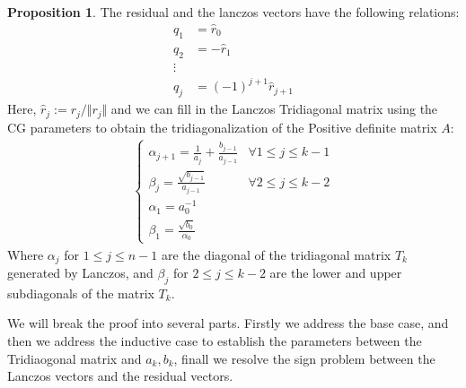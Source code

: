 \documentclass[]{article}
\theoremstyle{definition}
\newtheorem{prop}{Proposition}[section]  %
\begin{document}
        \begin{prop}
            The residual and the lanczos vectors have the following relations: 
            \begin{align}
                q_1 &= \hat r_0\\
                q_2 &= -\hat r_1
                \\
                \vdots
                \\
                q_j &= (-1)^{j + 1}\hat r_{j + 1}
            \end{align}
            Here, $\hat{r}_j:= r_j/\Vert r_j\Vert$ and we can fill in the Lanczos Tridiagonal matrix using the CG parameters to obtain the tridiagonalization of the Positive definite matrix $A$: 
            \begin{align}
                \begin{cases}
                    \alpha_{j + 1} = \frac{1}{a_j} + \frac{b_{j - 1}}{a_{j - 1}}
                    & \forall 1 \le j \le k - 1
                    \\
                    \beta_{j} = \frac{\sqrt{b_{j - 1}}}{a_{j - 1}}
                    & \forall 2 \le j \le k - 2 
                    \\
                    \alpha_1 = a_0^{-1} & 
                    \\
                    \beta_1 = \frac{\sqrt{b_0}}{\alpha_0}
                \end{cases}
            \end{align}
            Where $\alpha_j$ for $1\le j \le n - 1$ are the diagonal of the tridiagonal matrix $T_k$ generated by Lanczos, and $\beta_j$ for $2\le j \le k - 2$ are the lower and upper subdiagonals of the matrix $T_k$. 
        \end{prop}
        We will break the proof into several parts. Firstly we address the base case, and then we address the inductive case to establish the parameters between the Tridiaogonal matrix and $a_k, b_k$, finall we resolve the sign problem between the Lanczos vectors and the residual vectors. 
\end{document}
